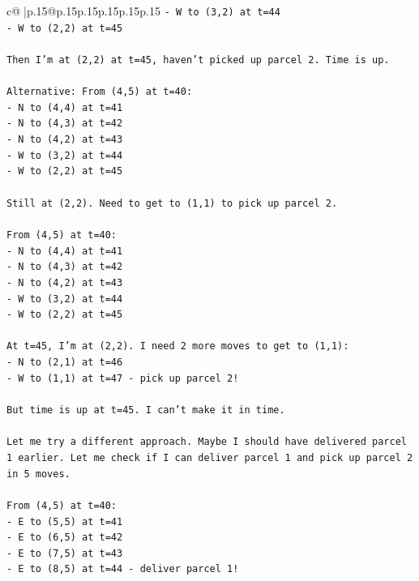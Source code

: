 \documentclass{article}
\begin{document}
{\begin{supertabular}{c@{$\;$}|p{.15\linewidth}@{}p{.15\linewidth}p{.15\linewidth}p{.15\linewidth}p{.15\linewidth}p{.15\linewidth}}
{{{\texttt{{-} W to (3,2) at t=44} \\
\texttt{{-} W to (2,2) at t=45} \\
\\ 
\texttt{Then I'm at (2,2) at t=45, haven't picked up parcel 2. Time is up.} \\
\\ 
\texttt{Alternative: From (4,5) at t=40:} \\
\texttt{{-} N to (4,4) at t=41} \\
\texttt{{-} N to (4,3) at t=42} \\
\texttt{{-} N to (4,2) at t=43} \\
\texttt{{-} W to (3,2) at t=44} \\
\texttt{{-} W to (2,2) at t=45} \\
\\ 
\texttt{Still at (2,2). Need to get to (1,1) to pick up parcel 2.} \\
\\ 
\texttt{From (4,5) at t=40:} \\
\texttt{{-} N to (4,4) at t=41} \\
\texttt{{-} N to (4,3) at t=42} \\
\texttt{{-} N to (4,2) at t=43} \\
\texttt{{-} W to (3,2) at t=44} \\
\texttt{{-} W to (2,2) at t=45} \\
\\ 
\texttt{At t=45, I'm at (2,2). I need 2 more moves to get to (1,1):} \\
\texttt{{-} N to (2,1) at t=46} \\
\texttt{{-} W to (1,1) at t=47 {-} pick up parcel 2!} \\
\\ 
\texttt{But time is up at t=45. I can't make it in time.} \\
\\ 
\texttt{Let me try a different approach. Maybe I should have delivered parcel 1 earlier. Let me check if I can deliver parcel 1 and pick up parcel 2 in 5 moves.} \\
\\ 
\texttt{From (4,5) at t=40:} \\
\texttt{{-} E to (5,5) at t=41} \\
\texttt{{-} E to (6,5) at t=42} \\
\texttt{{-} E to (7,5) at t=43} \\
\texttt{{-} E to (8,5) at t=44 {-} deliver parcel 1!} \\
}}}
\end{supertabular}}
\end{document}
